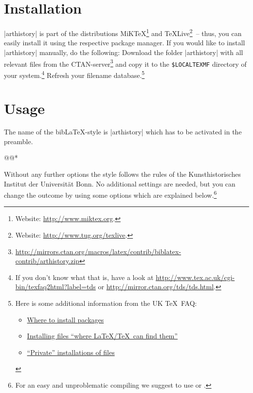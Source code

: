 \documentclass[a4paper,
10pt,
ngerman,
english
]{ltxdoc}
\begin{document}
\section{Installation}
|arthistory| is part of the distributions MiK\TeX \footnote{Website: \url{http://www.miktex.org}.} 
and \TeX Live\footnote{Website: \url{http://www.tug.org/texlive}.}~-- thus, you
can easily install it using the respective package manager. 
If you would like to
install |arthistory| manually, do the following:
Download the folder |arthistory| with all relevant files from the CTAN-server\footnote{\url{http://mirrors.ctan.org/macros/latex/contrib/biblatex-contrib/arthistory.zip}} and copy it to the \texttt{\$LOCALTEXMF} directory of
 your system.\footnote{If you don't know what that is, have a look at
\url{http://www.tex.ac.uk/cgi-bin/texfaq2html?label=tds} or 
\url{http://mirror.ctan.org/tds/tds.html}.} 
Refresh your filename database.\footnote{ 
Here is some additional information from the UK \TeX\ FAQ:
\begin{itemize}[nosep,after=\vspace{-\baselineskip} ]
  \item \href{%
    http://www.tex.ac.uk/cgi-bin/texfaq2html?label=install-where}{%
    Where to install packages}
  \item \href{%
    http://www.tex.ac.uk/cgi-bin/texfaq2html?label=inst-wlcf}{%
    Installing files \enquote{where \LaTeX /TeX\ can find them}}
  \item \href{%
    http://www.tex.ac.uk/cgi-bin/texfaq2html?label=privinst}{%
    \enquote{Private} installations of files}
\end{itemize}
}

\section{Usage}
  The name of the bib\LaTeX-style is |arthistory| which has to be activated in the preamble. 

\begin{code}
\usepackage[style=arthistory,%
          *@@*]{biblatex}
@@*
\end{code}

Without any further options the style follows the rules of the Kunsthistorisches Institut der Universität Bonn.
No additional settings are needed,
but you can change the outcome by using some options which are explained below.\footnote{For an easy and unproblematic compiling we suggest to use  or .}
\end{document}
